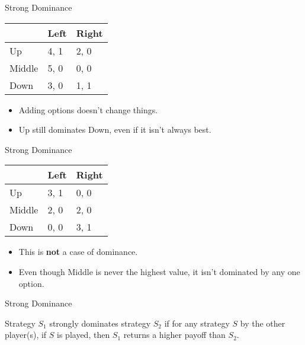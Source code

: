 \documentclass[
  ignorenonframetext,
]{beamer}
\providecommand{\tightlist}{%
  \setlength{\itemsep}{0pt}\setlength{\parskip}{0pt}}
\begin{document}
\begin{frame}{Strong Dominance}
\protect\hypertarget{strong-dominance-1}{}

\begin{table}[!h]
\centering
\begin{tabular}[t]{>{}l|ll}
\toprule
 & Left & Right\\
\midrule
Up & 4, 1 & 2, 0\\
Middle & 5, 0 & 0, 0\\
Down & 3, 0 & 1, 1\\
\bottomrule
\end{tabular}
\end{table}

\begin{itemize}
\tightlist
\item
  Adding options doesn't change things.
\item
  Up still dominates Down, even if it isn't always best.
\end{itemize}

\end{frame}

\begin{frame}{Strong Dominance}
\protect\hypertarget{strong-dominance-2}{}

\begin{table}[!h]
\centering
\begin{tabular}[t]{>{}l|ll}
\toprule
 & Left & Right\\
\midrule
Up & 3, 1 & 0, 0\\
Middle & 2, 0 & 2, 0\\
Down & 0, 0 & 3, 1\\
\bottomrule
\end{tabular}
\end{table}

\begin{itemize}
\tightlist
\item
  This is \textbf{not} a case of dominance.
\item
  Even though Middle is never the highest value, it isn't dominated by
  any one option.
\end{itemize}

\end{frame}

\begin{frame}{Strong Dominance}
\protect\hypertarget{strong-dominance-3}{}

Strategy \(S_1\) strongly dominates strategy \(S_2\) if for any strategy
\(S\) by the other player(s), if \(S\) is played, then \(S_1\) returns a
higher payoff than \(S_2\).

\end{frame}
\end{document}
